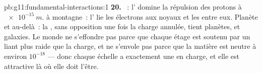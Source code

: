 \begin{solution}{pb:g11:fundamental-interactions:1}
\textbf{20.} ~: l'
 domine la répulsion des
protons à $\qty{e-15}{m}$.
 à montagne~: l'
 lie les
électrons aux noyaux et les
 entre eux. Planète et au-delà~:
la , sans opposition une fois
la charge annulée, tient planètes,
 et galaxies. Le monde ne
s'effondre pas parce que chaque étage est soutenu par un liant plus
raide que la charge, et ne s'envole pas parce que la matière est neutre
à environ $10^{-18}$ --- donc chaque échelle a exactement une
 en charge, et elle est attractive là
où elle doit l'être.
\end{solution}
